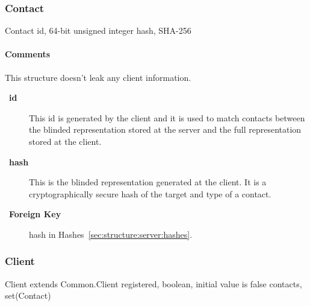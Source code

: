 \documentclass[a4paper,10pt,draft]{article}
\let\Item\item
\newcommand\SpecialItem{\renewcommand\item[1][]{\Item[\textbullet~\bfseries##1]}
}
\begin{document}
\subsubsection{Contact}
\label{sec:structure:server:contact}

\begin{verbbox}
Contact
{
  id, 64-bit unsigned integer
  hash, SHA-256
}
\end{verbbox}
\begin{center}
\theverbbox
\end{center}

\begin{inparaitem}[ ]
 \item \infrastructure
\end{inparaitem}

\paragraph*{Comments}
This structure doesn't leak any client information.

\SpecialItem
\begin{description}
 \item[id] This id is generated by the client and it is used to match contacts between the blinded representation stored at the server and the full representation stored at the 
client.
 \item[hash] This is the blinded representation generated at the client. It is a cryptographically secure hash of the target and type of a contact.
\end{description}

\SpecialItem
\begin{description}
 \item[Foreign Key] hash in Hashes~\ref{sec:structure:server:hashes}.
\end{description}

\subsubsection{Client}

\begin{verbbox}
Client extends Common.Client
{
  registered, boolean, initial value is false
  contacts, set(Contact)
}
\end{verbbox}
\begin{center}
\theverbbox
\end{center}

\begin{inparaitem}[ ]
 \item \infrastructure
\end{inparaitem}
\end{document}
